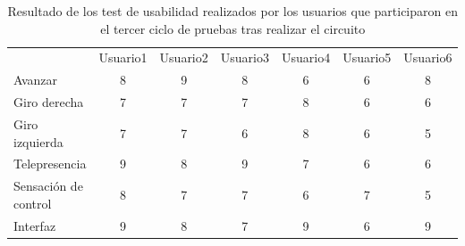 \documentclass[twoside, 11pt]{epstfg}
\begin{document}
\begin{center}
	\begin{table}[h!]
		\small
		
		\begin{tabular}{|g c c c c c c|}
			\hline
			 \\ \hline
			& Usuario1	&Usuario2	&Usuario3	&Usuario4	&Usuario5	&Usuario6 \\
			Avanzar
			& 8 &9 &8 &6 &6 & 8\\
			Giro derecha
			& 7 & 7 &7 &8 & 6& 6\\
			Giro izquierda
			& 7 & 7&6 &8 &6 & 5\\
			Telepresencia
			& 9 & 8 &9 & 7& 6& 6\\ 
			Sensación de control
			& 8 &7 &7 & 6&7 & 5\\
			Interfaz
			& 9 &8 & 7& 9& 6& 9\\
			\hline
		\end{tabular}
		
		\caption{Resultado de los test de usabilidad realizados por los usuarios que participaron en el tercer ciclo de pruebas tras realizar el circuito}
		\label{tabla23ciclo}
	\end{table}
\end{center}

\cleardoublepage
\printindex
\end{document}
